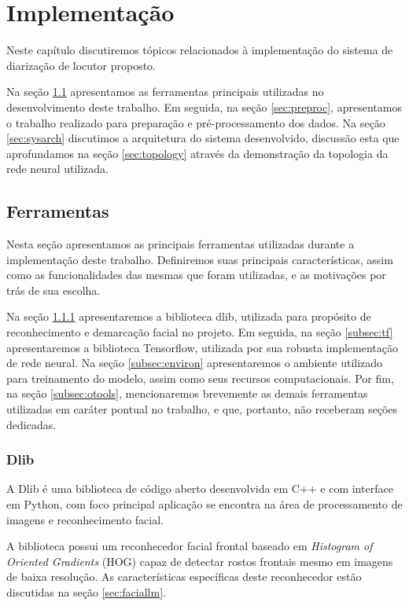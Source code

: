 \chapter{Implementação}
\label{chap:impl}

Neste capítulo discutiremos tópicos relacionados à implementação do sistema de diarização de locutor proposto. 

Na seção \ref{sec:tools} apresentamos as ferramentas principais utilizadas no desenvolvimento deste trabalho. Em seguida, na seção \ref{sec:preproc}, apresentamos o trabalho realizado para preparação e pré-processamento dos dados. Na seção \ref{sec:sysarch} discutimos a arquitetura do sistema desenvolvido, discussão esta que aprofundamos na seção \ref{sec:topology} através da demonstração da topologia da rede neural utilizada.

\section{Ferramentas}
\label{sec:tools}

Nesta seção apresentamos as principais ferramentas utilizadas durante a implementação deste trabalho. Definiremos suas principais características, assim como as funcionalidades das mesmas que foram utilizadas, e as motivações por trás de sua escolha.

Na seção \ref{subsec:dlib} apresentaremos a biblioteca dlib, utilizada para propósito de reconhecimento e demarcação facial no projeto. Em seguida, na seção \ref{subsec:tf} apresentaremos a biblioteca Tensorflow, utilizada por sua robusta implementação de rede neural. Na seção \ref{subsec:environ} apresentaremos o ambiente utilizado para treinamento do modelo, assim como seus recursos computacionais. Por fim, na seção \ref{subsec:otools}, mencionaremos brevemente as demais ferramentas utilizadas em caráter pontual no trabalho, e que, portanto, não receberam seções dedicadas.

\subsection{Dlib}
\label{subsec:dlib}
A Dlib\cite{dlib09} é uma biblioteca de código aberto desenvolvida em C++ e com interface em Python, com foco principal aplicação se encontra na área de processamento de imagens e reconhecimento facial. 

A biblioteca possui um reconhecedor facial frontal baseado em \textit{Histogram of Oriented Gradients} (HOG) capaz de detectar rostos frontais mesmo em imagens de baixa resolução. As características específicas deste reconhecedor estão discutidas na seção \ref{sec:faciallm}.

